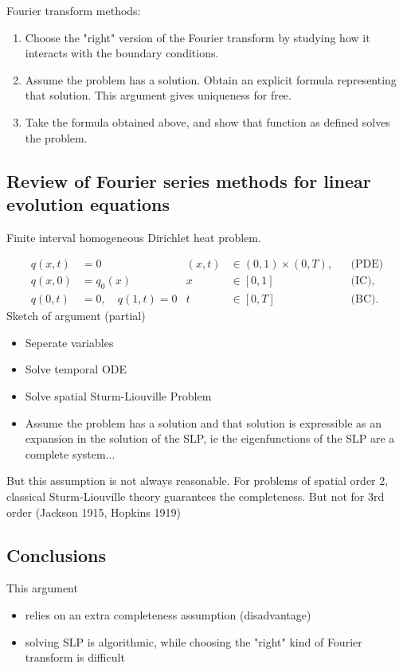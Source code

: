 Fourier transform methods:
\begin{enumerate}
	\item Choose the "right" version of the Fourier transform by studying how it interacts with the boundary conditions.
	\item Assume the problem has a solution. Obtain an explicit formula representing that solution. This argument gives uniqueness for free.
	\item Take the formula obtained above, and show that function as defined solves the problem.
\end{enumerate}

\subsection{Review of Fourier series methods for linear evolution equations}
Finite interval homogeneous Dirichlet heat problem.

\begin{align*}
[\partial_t- \partial_{xx}]q(x,t) &= 0 &(x,t) &\in (0,1) \times (0,T),&  &\text{(PDE)}\\
q(x,0) &= q_0(x) & x &\in [0,1]& &\text{(IC)},\\
q(0,t) &= 0, \quad q(1,t) =0 & t &\in [0,T] & &\text{(BC)}. 
\end{align*}
Sketch of argument (partial)
\begin{itemize}
	\item Seperate variables
	\item Solve temporal ODE
	\item Solve spatial Sturm-Liouville Problem
	\item Assume the problem has a solution and that solution is expressible as an expansion in the solution of the SLP, ie the eigenfunctions of the SLP are a complete system...
\end{itemize}
But this assumption is not always reasonable. For problems of spatial order 2, classical Sturm-Liouville theory guarantees the completeness. But not for 3rd order (Jackson 1915, Hopkins 1919)

\subsection*{Conclusions}
This argument
\begin{itemize}
	\item relies on an extra completeness assumption (disadvantage)
	\item solving SLP is algorithmic, while choosing the "right" kind of Fourier transform is difficult
\end{itemize}


